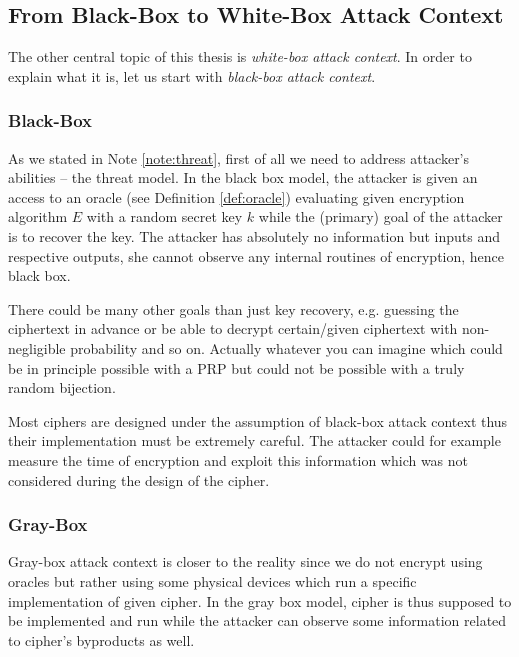 
\subsection{From Black-Box to White-Box Attack Context}

The other central topic of this thesis is {\em white-box attack context}. In order to explain what it is, let us start with {\em black-box attack context}.

\subsubsection{Black-Box}

As we stated in Note \ref{note:threat}, first of all we need to address attacker's abilities -- the threat model. In the black box model, the attacker is given an access to an oracle (see Definition \ref{def:oracle}) evaluating given encryption algorithm $E$ with a random secret key $k$ while the (primary) goal of the attacker is to recover the key. The attacker has absolutely no information but inputs and respective outputs, she cannot observe any internal routines of encryption, hence black box.

\begin{note}
	There could be many other goals than just key recovery, e.g. guessing the ciphertext in advance or be able to decrypt certain/given ciphertext with non-negligible probability and so on. Actually whatever you can imagine which could be in principle possible with a PRP but could not be possible with a truly random bijection.
\end{note}

Most ciphers are designed under the assumption of black-box attack context thus their implementation must be extremely careful. The attacker could for example measure the time of encryption and exploit this information which was not considered during the design of the cipher.

\subsubsection{Gray-Box}

Gray-box attack context is closer to the reality since we do not encrypt using oracles but rather using some physical devices which run a specific implementation of given cipher. In the gray box model, cipher is thus supposed to be implemented and run while the attacker can observe some information related to cipher's byproducts as well.

